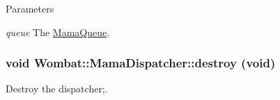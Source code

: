 \begin{DoxyParams}{Parameters}
\item[{\em queue}]The \hyperlink{classWombat_1_1MamaQueue}{MamaQueue}. \end{DoxyParams}
\hypertarget{classWombat_1_1MamaDispatcher_aef804bf330b0fec1594bdddf41c0d82c}{
\subsubsection[{destroy}]{\setlength{\rightskip}{0pt plus 5cm}void Wombat::MamaDispatcher::destroy (void)}}
\label{classWombat_1_1MamaDispatcher_aef804bf330b0fec1594bdddf41c0d82c}


Destroy the dispatcher;. 